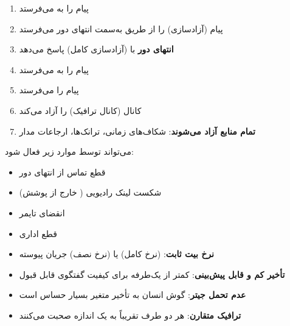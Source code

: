 \begin{enumerate}
\def\labelenumi{\arabic{enumi}.}
\tightlist
\item
   پیام  را به  می‌فرستد
\item
   پیام  (آزادسازی) را از طریق  به‌سمت انتهای دور می‌فرستد
\item
  \textbf{انتهای دور} با  (آزادسازی کامل) پاسخ می‌دهد
\item
   پیام  را به  می‌فرستد
\item
   پیام  را می‌فرستد
\item
   کانال  (کانال ترافیک) را آزاد می‌کند
\item
  \textbf{تمام منابع آزاد می‌شوند}: شکاف‌های زمانی، ترانک‌ها، ارجاعات مدار
\end{enumerate}


می‌تواند توسط موارد زیر فعال شود:

\begin{itemize}
\tightlist
\item
  قطع تماس از انتهای دور
\item
  شکست لینک رادیویی ( خارج از پوشش)
\item
  انقضای تایمر 
\item
  قطع اداری
\end{itemize}






\CNchained{}

\CNchained{}

\begin{itemize}
\tightlist
\item
  \textbf{نرخ بیت ثابت}:  (نرخ کامل) یا  (نرخ نصف)  جریان پیوسته
\item
  \textbf{تأخیر کم و قابل پیش‌بینی}: کمتر از  یک‌طرفه برای کیفیت گفتگوی قابل قبول
\item
  \textbf{عدم تحمل جیتر}: گوش انسان به تأخیر متغیر بسیار حساس است
\item
  \textbf{ترافیک متقارن}: هر دو طرف تقریباً به یک اندازه صحبت می‌کنند
\end{itemize}

